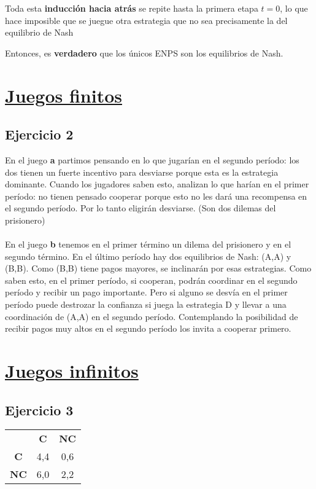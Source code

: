 \documentclass{article}
\begin{document}
                Toda esta \textbf{inducción hacia atrás} se repite hasta la primera etapa $t=0$, lo que hace imposible que se juegue otra estrategia que no sea precisamente la del equilibrio de Nash
                
                Entonces, es \textbf{verdadero} que los únicos ENPS son los equilibrios de Nash.
    \section*{\underline{\textbf{Juegos finitos}}}
        \subsection*{Ejercicio 2}
            En el juego \textbf{a} partimos pensando en lo que jugarían en el segundo período: los dos tienen un fuerte incentivo para desviarse porque esta es la estrategia dominante. Cuando los jugadores saben esto, analizan lo que harían en el primer período: no tienen pensado cooperar porque esto no les dará una recompensa en el segundo período. Por lo tanto eligirán desviarse. (Son dos dilemas del prisionero)
            \\
            \\
            En el juego \textbf{b} tenemos en el primer término un dilema del prisionero y en el segundo término. En el último período hay dos equilibrios de Nash: (A,A) y (B,B). Como (B,B) tiene pagos mayores, se inclinarán por esas estrategias. Como saben esto, en el primer período, si cooperan, podrán coordinar en el segundo período y recibir un pago importante. Pero si alguno se desvía en el primer período puede destrozar la confianza si juega la estrategia D y llevar a una coordinación de (A,A) en el segundo período. Contemplando la posibilidad de recibir pagos muy altos en el segundo período los invita a cooperar primero.
    \section*{\underline{\textbf{Juegos infinitos}}}
        \subsection*{Ejercicio 3}
            \begin{table}[h]
                \begin{center}
                    \begin{tabular}{ccc}
                         & \textbf{C} & \textbf{NC} \\
                        \textbf{C} & 4,4 & 0,6\\
                        \textbf{NC} & 6,0 & 2,2\\
                    \end{tabular}
                \end{center}
            \end{table}
\end{document}
